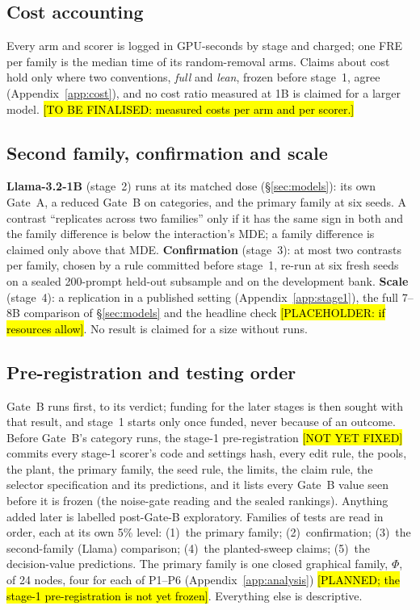 \documentclass{article}
\theoremstyle{plain}
\theoremstyle{definition}
\theoremstyle{remark}
\newcommand{\ph}[1]{\hl{#1}}
\begin{document}
\subsection{Cost accounting}
\label{sec:cost}

Every arm and scorer is logged in GPU-seconds by stage and charged; one FRE
per family is the median time of its random-removal arms. Claims about cost hold only where two conventions,
\emph{full} and \emph{lean}, frozen before stage~1, agree
(Appendix~\ref{app:cost}), and no cost ratio measured at 1B is claimed for a
larger model. \ph{[TO BE FINALISED: measured costs per arm and per scorer.]}

\subsection{Second family, confirmation and scale}
\label{sec:family}

\textbf{Llama-3.2-1B} (stage~2) runs at its matched dose (\S\ref{sec:models}):
its own Gate~A, a reduced Gate~B on categories, and the primary family at six
seeds. A contrast ``replicates across two families'' only if it has the same
sign in both and the family difference is below the interaction's MDE; a
family difference is claimed only above that MDE. \textbf{Confirmation}
(stage~3): at most two contrasts per family, chosen by a rule committed before
stage~1, re-run at six fresh seeds on a sealed 200-prompt held-out subsample
and on the development bank. \textbf{Scale} (stage~4): a replication in a
published setting (Appendix~\ref{app:stage1}), the full 7--8B comparison of
\S\ref{sec:models} and the headline check \ph{[PLACEHOLDER: if resources
allow]}. No result is claimed for a size without runs.

\subsection{Pre-registration and testing order}
\label{sec:prereg}

Gate~B runs first, to its verdict; funding for the later stages is then
sought with that result, and stage~1 starts only once funded, never because of
an outcome. Before Gate~B's category runs, the stage-1 pre-registration
\ph{[NOT YET FIXED]} commits every stage-1 scorer's code and settings hash,
every edit rule, the pools, the plant, the primary family, the seed rule, the
limits, the claim rule, the selector specification and its predictions, and
it lists every Gate~B value seen before it is frozen (the noise-gate reading
and the sealed rankings). Anything added later is labelled post-Gate-B
exploratory. Families of tests are read in order, each at its own 5\% level:
(1)~the primary family; (2)~confirmation; (3)~the second-family (Llama)
comparison; (4)~the planted-sweep claims; (5)~the decision-value predictions.
The primary family is one closed graphical family, $\Phi$, of 24 nodes, four
for each of P1--P6 (Appendix~\ref{app:analysis}) \ph{[PLANNED; the stage-1 pre-registration is not yet frozen]}. Everything else is
descriptive.
\end{document}
